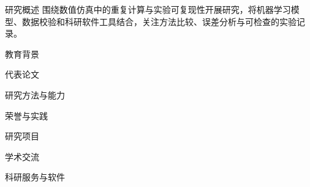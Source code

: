 \documentclass{resume}
\begin{document}
\makecvheader
\begin{rSectionWithTags}{研究概述}{\enspace{}\enspace{}}
围绕数值仿真中的重复计算与实验可复现性开展研究，将机器学习模型、数据校验和科研软件工具结合，关注方法比较、误差分析与可检查的实验记录。
\end{rSectionWithTags}
\begin{rSection}{教育背景}
\ExampleEducation
\end{rSection}
\begin{rSection}{代表论文}
\ExamplePublications
{}
\end{rSection}
\begin{rSection}{研究方法与能力}
\ExampleSkills
\end{rSection}
\begin{rSection}{荣誉与实践}
\ExampleAwards
\ExamplePractice
\end{rSection}
\newpage
\begin{rSection}{研究项目}
\HeatProject
\UncertaintyProject
\AssistantProject
\WorkflowProject
\end{rSection}
\begin{rSection}{学术交流}
\begin{itemize}
\end{itemize}
\end{rSection}
\begin{rSection}{科研服务与软件}
\ExampleContributions
\end{rSection}
\end{document}
